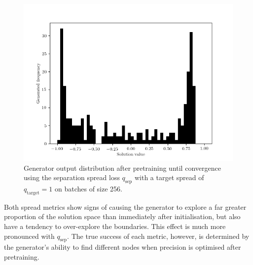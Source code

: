 \documentclass[../../main.tex]{subfiles}
\begin{document}
\begin{figure}[H]
    \begin{center}
    \includegraphics[width=\textwidth]{separationSpread}
    \caption{
        Generator output distribution after pretraining until convergence using the separation spread loss $q_\text{sep}$ with a target spread of $q_\text{target} = 1$ on batches of size 256.
    }
    \label{fig:separationSpread}
    \end{center}
\end{figure}
Both spread metrics show signs of causing the generator to explore a far greater proportion of the solution space than immediately after initialisation, but also have a tendency to over-explore the boundaries.
This effect is much more pronounced with $q_\text{sep}$.
The true success of each metric, however, is determined by the generator's ability to find different nodes when precision is optimised after pretraining.
\end{document}
